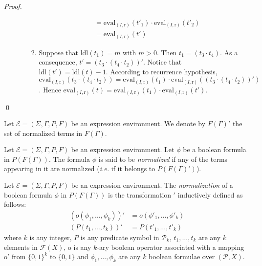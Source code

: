 \documentclass[a4paper]{llncs}
\begin{document}
\begin{proof}
\begin{enumerate}
\begin{enumerate}
\begin{enumerate}
\begin{align*}
          & =\mathrm{eval}_{(I,\mathrm{r})}(t'_1) \cdot \mathrm{eval}_{(I,\mathrm{r})}(t'_2)\\
          & = \mathrm{eval}_{(I,\mathrm{r})}(t')
        \end{align*}      
    \item Suppose that $\mathrm{ldl}(t_1)=m$ with $m>0$. Then $t_1=(t_3\cdot t_4)$. As a consequence, $t'=(t_3\cdot(t_4\cdot t_2))'$. Notice that $\mathrm{ldl}(t')=\mathrm{ldl}(t)-1$. According to recurrence hypothesis,
    $\mathrm{eval}_{(I,\mathrm{r})}(t_3\cdot(t_4\cdot t_2))=\mathrm{eval}_{(I,\mathrm{r})}(t_1)\cdot \mathrm{eval}_{(I,\mathrm{r})}((t_3\cdot(t_4\cdot t_2))')$. Hence
    $\mathrm{eval}_{(I,\mathrm{r})}(t)=\mathrm{eval}_{(I,\mathrm{r})}(t_1)\cdot \mathrm{eval}_{(I,\mathrm{r})}(t')$.
    \end{enumerate}
    \end{enumerate}
    \end{enumerate}    
    \qed
  \end{proof}
  
  Let $\mathcal{E}=(\Sigma,\Gamma,P,F)$ be an expression environment. We denote by $F(\Gamma)'$ the set of normalized terms in $F(\Gamma)$.   
  
  \begin{definition}
    Let $\mathcal{E}=(\Sigma,\Gamma,P,F)$ be an expression environment. Let $\phi$ be a boolean formula in $P(F(\Gamma))$. The formula $\phi$ is said to be \emph{normalized} if any of the terms appearing in it are normalized (\emph{i.e.} if it belongs to $P(F(\Gamma)')$).
  \end{definition} 
  
  
  \begin{definition}
    Let $\mathcal{E}=(\Sigma,\Gamma,P,F)$ be an expression environment. The \emph{normalization} of a boolean formula $\phi$ in $P(F(\Gamma))$ is the transformation $'$ inductively defined as follows:
        \begin{align*}
        (o(\phi_1,\ldots,\phi_k))'&=o(\phi'_1,\ldots,\phi'_k)\\
        (P(t_1,\ldots,t_k))'&=P(t'_1,\ldots,t'_k)
        \end{align*}
        where $k$ is any integer, $P$ is any predicate symbol in $\mathcal{P}_k$, $t_1,\ldots,t_k$ are any $k$ elements in $\mathcal{F}(X)$, $\mathrm{o}$ is any $k$-ary boolean operator associated with a mapping $\mathrm{o}'$ from $\{0,1\}^k$ to $\{0,1\}$ and $\phi_1,\ldots,\phi_k$ are any $k$ boolean formulae over $(\mathcal{P},X)$.
  \end{definition}
  
\end{document}
